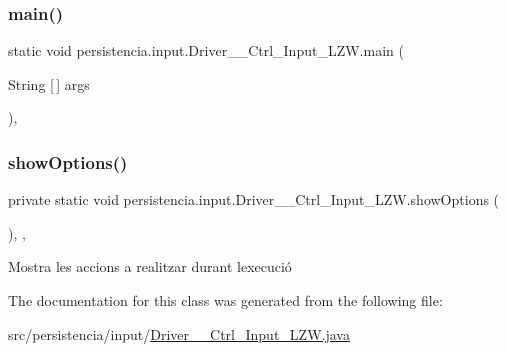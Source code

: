\subsubsection{\texorpdfstring{main()}{main()}}
{\footnotesize\ttfamily static void persistencia.\+input.\+Driver\+\_\+\+\_\+\+Ctrl\+\_\+\+Input\+\_\+\+L\+Z\+W.\+main (\begin{DoxyParamCaption}\item[{String \mbox{[}$\,$\mbox{]}}]{args }\end{DoxyParamCaption})\hspace{0.3cm}{\ttfamily [inline]}, {\ttfamily [static]}}

\mbox{\label{classpersistencia_1_1input_1_1Driver____Ctrl__Input__LZW_a6b5f6f40be349f75d3ac91ecfb453088}} 
\subsubsection{\texorpdfstring{show\+Options()}{showOptions()}}
{\footnotesize\ttfamily private static void persistencia.\+input.\+Driver\+\_\+\+\_\+\+Ctrl\+\_\+\+Input\+\_\+\+L\+Z\+W.\+show\+Options (\begin{DoxyParamCaption}{ }\end{DoxyParamCaption})\hspace{0.3cm}{\ttfamily [inline]}, {\ttfamily [static]}, {\ttfamily [private]}}



Mostra les accions a realitzar durant l\textquotesingle{}execució 



The documentation for this class was generated from the following file\+:\begin{DoxyCompactItemize}
\item 
src/persistencia/input/\hyperlink{Driver____Ctrl__Input__LZW_8java}{Driver\+\_\+\+\_\+\+Ctrl\+\_\+\+Input\+\_\+\+L\+Z\+W.\+java}\end{DoxyCompactItemize}
